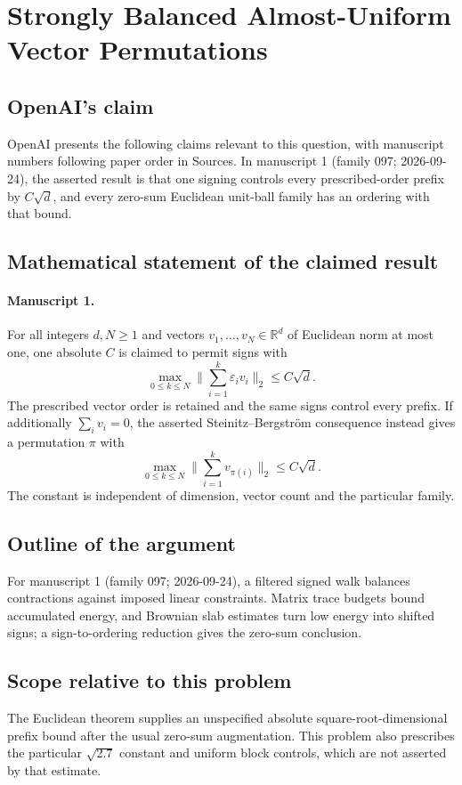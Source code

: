 \documentclass[11pt]{article}
\begin{document}
\section*{Strongly Balanced Almost-Uniform Vector Permutations}

\subsection{OpenAI's claim}
OpenAI presents the following claims relevant to this question, with manuscript numbers following paper order in Sources. In manuscript 1 (family 097; 2026-09-24), the asserted result is that one signing controls every prescribed-order prefix by $C\sqrt d$, and every zero-sum Euclidean unit-ball family has an ordering with that bound.

\subsection{Mathematical statement of the claimed result}
\paragraph{Manuscript 1.}
For all integers $d,N\ge1$ and vectors $v_1,\ldots,v_N\in\mathbb R^d$ of Euclidean norm at most one, one absolute $C$ is claimed to permit signs with
\[
 \max_{0\le k\le N}\|\sum_{i=1}^k\varepsilon_iv_i\|_2\le C\sqrt d.
\]
The prescribed vector order is retained and the same signs control every prefix. If additionally $\sum_iv_i=0$, the asserted Steinitz--Bergstr\"om consequence instead gives a permutation $\pi$ with
\[
 \max_{0\le k\le N}\|\sum_{i=1}^kv_{\pi(i)}\|_2\le C\sqrt d.
\]
The constant is independent of dimension, vector count and the particular family.

\subsection{Outline of the argument}
For manuscript 1 (family 097; 2026-09-24), a filtered signed walk balances contractions against imposed linear constraints. Matrix trace budgets bound accumulated energy, and Brownian slab estimates turn low energy into shifted signs; a sign-to-ordering reduction gives the zero-sum conclusion.

\subsection{Scope relative to this problem}
The Euclidean theorem supplies an unspecified absolute square-root-dimensional prefix bound after the usual zero-sum augmentation. This problem also prescribes the particular $\sqrt{2.7}$ constant and uniform block controls, which are not asserted by that estimate.
\end{document}

